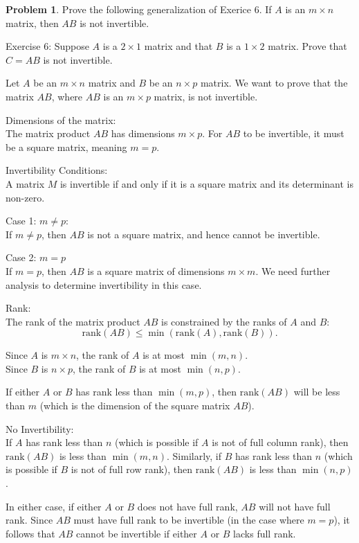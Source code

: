 \documentclass[12pt]{article}
\theoremstyle{definition}
\newtheorem{problem}{Problem}
\begin{document}
\begin{problem}
    Prove the following generalization of Exerice 6. If $A$ is an $m \times n$ matrix, then $AB$ is not invertible.
    
    Exercise 6: Suppose $A$ is a $2 \times 1$ matrix and that $B$ is a $1 \times 2$ matrix. Prove that $C = AB$ is not invertible.
    
    \begin{solution}
    Let \( A \) be an \( m \times n \) matrix and \( B \) be an \( n \times p \) matrix. We want to prove that the matrix \( AB \), where \( AB \) is an \( m \times p \) matrix, is not invertible.

    Dimensions of the matrix:\\
    The matrix product \( AB \) has dimensions \( m \times p \). For \( AB \) to be invertible, it must be a square matrix, meaning \( m = p \). 

    Invertibility Conditions:\\
    A matrix \( M \) is invertible if and only if it is a square matrix and its determinant is non-zero. 

    Case 1: \( m \ne p \):\\
    If \( m \ne p \), then \( AB \) is not a square matrix, and hence cannot be invertible.

    Case 2: \( m = p \)\\
    If \( m = p \), then \( AB \) is a square matrix of dimensions \( m \times m \). We need further analysis to determine invertibility in this case.

    Rank:\\
    The rank of the matrix product \( AB \) is constrained by the ranks of \( A \) and \( B \):
    \[
    \text{rank}(AB) \leq \min(\text{rank}(A), \text{rank}(B)).
    \]

    Since \( A \) is \( m \times n \), the rank of \( A \) is at most \( \min(m, n) \).\\
    Since \( B \) is \( n \times p \), the rank of \( B \) is at most \( \min(n, p) \).

    If either \( A \) or \( B \) has rank less than \( \min(m, p) \), then \( \text{rank}(AB) \) will be less than \( m \) (which is the dimension of the square matrix \( AB \)).

    No Invertibility:\\
    If \( A \) has rank less than \( n \) (which is possible if \( A \) is not of full column rank), then \( \text{rank}(AB) \) is less than \( \min(m, n) \).
    Similarly, if \( B \) has rank less than \( n \) (which is possible if \( B \) is not of full row rank), then \( \text{rank}(AB) \) is less than \( \min(n, p) \).

    In either case, if either \( A \) or \( B \) does not have full rank, \( AB \) will not have full rank. Since \( AB \) must have full rank to be invertible (in the case where \( m = p \)), it follows that \( AB \) cannot be invertible if either \( A \) or \( B \) lacks full rank.
    \end{solution}
\end{problem}
\end{document}
